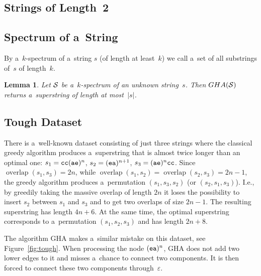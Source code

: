 \documentclass[11pt]{article}
\newtheorem{lemma}{Lemma}
\DeclareMathOperator{\overlap}{overlap}
\begin{document}
\subsection{Strings of Length~2}
\cite{GMS1980}

\subsection{Spectrum of a~String}
\cite{pevzner2001eulerian}


By a~$k$-spectrum of a~string $s$ 
(of length at least~$k$)
we call a~set of all substrings of~$s$ of length~$k$.

\begin{lemma}
Let ${\cal S}$ be a~$k$-spectrum of an unknown string~$s$. Then $GHA({\cal S})$ returns a~superstring of length at most~$|s|$. 
\end{lemma}

\subsection{Tough Dataset}
There is a~well-known dataset consisting of just three strings where the classical greedy algorithm produces a~superstring that is almost twice longer than an optimal one: $s_1={\tt cc}({\tt ae})^n$, $s_2=({\tt ea})^{n+1}$, $s_3=({\tt ae})^n{\tt cc}$. Since $\overlap(s_1, s_3)=2n$,
 while $\overlap(s_1,s_2)=\overlap(s_2,s_3)=2n-1$, the greedy algorithm produces a~permutation $(s_1, s_3, s_2)$ (or $(s_2,s_1,s_3)$). I.e., by greedily taking the massive overlap of length $2n$ it loses the possibility to insert $s_2$ between $s_1$ and $s_3$ and to get two overlaps of size $2n-1$. The resulting superstring has length $4n+6$. At the same time, the optimal superstring corresponds to a~permutation $(s_1,s_2,s_3)$ and has length $2n+8$.
 
The algorithm GHA makes a~similar mistake on this dataset, see Figure~\ref{fig:tough}. When processing the node $({\tt ea})^n$, GHA does not add two lower edges to it and misses a~chance to connect two components. It is then forced to connect these two components through~$\varepsilon$.
\end{document}
